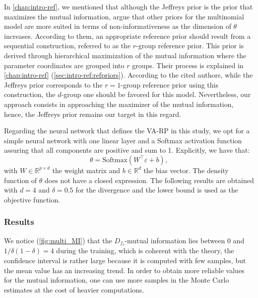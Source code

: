 In \cref{chap:intro-ref}, we mentioned that
although the Jeffreys prior is the prior that maximizes the mutual information, \citet{berger_ordered_1992,berger_overall_2015} argue that other priors for the multinomial model are more suited in terms of non-informativeness as the dimension of $\theta$ increases. {According to them, an appropriate reference prior should result from a sequential construction}, referred to as the $r$-group reference prior. This prior is derived through hierarchical maximization of the mutual information where the parameter coordinates are grouped into $r$ groups. Their process is explained in \cref{chap:intro-ref} (\cref{sec:intro-ref:refpriors}). According to the cited authors, while the Jeffreys prior corresponds to the $r=1$-group reference prior using this construction, the $d$-group one should be favored for this model. 
Nevertheless, our approach consists in approaching the maximizer of the mutual information, hence, the Jeffreys prior remains our target in this regard.




Regarding the neural network that defines the VA-RP in this study, we opt for a simple neural network with one linear layer and a Softmax activation function assuring that all components are positive and sum to 1. Explicitly, we have that: 
\begin{equation}
    \theta = \text{Softmax}(W^{\top}\varepsilon + b),
\end{equation}
with $W \in \mathbb{R}^{p\times d}$ the weight matrix and $b \in \mathbb{R}^d$ the bias vector. The density function of $\theta$ does not have a closed expression. The following results are obtained with $d=4$ and $\delta=0.5$ for the divergence and the lower bound is used as the objective function.



\subsubsection{Results}



We notice (\cref{fig:multi_MI}) that the $D_{f_\delta}$-mutual information lies between $0$ and $1/\delta(1-\delta) = 4$ during the training, which is coherent with the theory, the confidence interval is rather large because it is computed with few samples, but the mean value has an increasing trend. {In order to obtain more reliable values for the mutual information, one can use more samples in the Monte Carlo estimates at the cost of heavier computations.}

